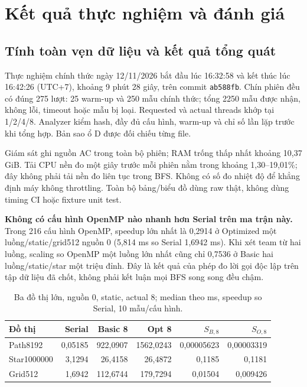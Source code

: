 \chapter{Kết quả thực nghiệm và đánh giá}
\section{Tính toàn vẹn dữ liệu và kết quả tổng quát}
Thực nghiệm chính thức ngày 12/11/2026 bắt đầu lúc 16:32:58 và kết thúc lúc 16:42:26 (UTC+7), khoảng 9 phút 28 giây, trên commit \texttt{ab588fb}. Chín phiên đều có đúng 275 lượt: 25 warm-up và 250 mẫu chính thức; tổng 2250 mẫu được nhận, không lỗi, timeout hoặc mẫu bị loại. Requested và actual threads khớp tại 1/2/4/8. Analyzer kiểm hash, đầy đủ cấu hình, warm-up và chỉ số lần lặp trước khi tổng hợp. Bản sao ổ D được đối chiếu từng file.

Giám sát ghi nguồn AC trong toàn bộ phiên; RAM trống thấp nhất khoảng 10,37 GiB. Tải CPU nền đo một giây trước mỗi phiên nằm trong khoảng 1,30--19,01\%; đây không phải tải nền đo liên tục trong BFS. Không có số đo nhiệt độ để khẳng định máy không throttling. Toàn bộ bảng/biểu đồ dùng raw thật, không dùng timing CI hoặc fixture unit test.

\textbf{Không có cấu hình OpenMP nào nhanh hơn Serial trên ma trận này.} Trong 216 cấu hình OpenMP, speedup lớn nhất là 0,2914 ở Optimized một luồng/static/grid512 nguồn 0 (5,814 ms so Serial 1,6942 ms). Khi xét team từ hai luồng, scaling so OpenMP một luồng lớn nhất cũng chỉ 0,7536 ở Basic hai luồng/static/star một triệu đỉnh. Đây là kết quả của phép đo lời gọi độc lập trên tập dữ liệu đã chốt, không phải kết luận mọi BFS song song đều chậm.

\begin{table}[htbp]\centering\small
\caption{Ba đồ thị lớn, nguồn 0, static, actual 8; median theo ms, speedup so Serial, 10 mẫu/cấu hình.}\label{tab:headline}
\begin{tabular}{lrrrrr}\toprule
Đồ thị & Serial & Basic 8 & Opt 8 & $S_{B,8}$ & $S_{O,8}$ \\\midrule
Path8192 & 0,05185 & 922,0907 & 1562,0243 & 0,00005623 & 0,00003319 \\
Star1000000 & 3,1294 & 26,4158 & 26,4872 & 0,1185 & 0,1181 \\
Grid512 & 1,6942 & 112,6744 & 179,7294 & 0,01504 & 0,009426 \\\bottomrule
\end{tabular}\end{table}

